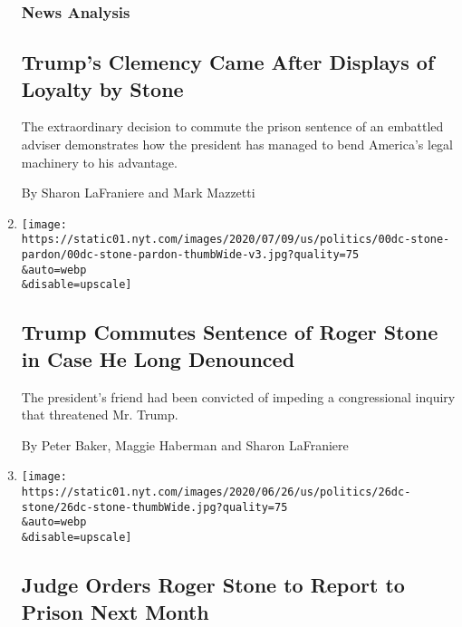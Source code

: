 \begin{enumerate}
  \hypertarget{news-analysis}{%
  \subsubsection{News Analysis}\label{news-analysis}}

  \hypertarget{trumps-clemency-came-after-displays-of-loyalty-by-stone}{%
  \subsection{Trump's Clemency Came After Displays of Loyalty by
  Stone}\label{trumps-clemency-came-after-displays-of-loyalty-by-stone}}

  The extraordinary decision to commute the prison sentence of an
  embattled adviser demonstrates how the president has managed to bend
  America's legal machinery to his advantage.

  By Sharon LaFraniere and Mark Mazzetti
\item
  \href{/2020/07/10/us/politics/trump-roger-stone-clemency.html}{}

  \texttt{[image: https://static01.nyt.com/images/2020/07/09/us/politics/00dc-stone-pardon/00dc-stone-pardon-thumbWide-v3.jpg?quality=75\\\&auto=webp\\\&disable=upscale]}

  \hypertarget{trump-commutes-sentence-of-roger-stone-in-case-he-long-denounced}{%
  \subsection{Trump Commutes Sentence of Roger Stone in Case He Long
  Denounced}\label{trump-commutes-sentence-of-roger-stone-in-case-he-long-denounced}}

  The president's friend had been convicted of impeding a congressional
  inquiry that threatened Mr. Trump.

  By Peter Baker, Maggie Haberman and Sharon LaFraniere
\item
  \href{/2020/06/26/us/politics/roger-stone-prison.html}{}

  \texttt{[image: https://static01.nyt.com/images/2020/06/26/us/politics/26dc-stone/26dc-stone-thumbWide.jpg?quality=75\\\&auto=webp\\\&disable=upscale]}

  \hypertarget{judge-orders-roger-stone-to-report-to-prison-next-month}{%
  \subsection{Judge Orders Roger Stone to Report to Prison Next
  Month}\label{judge-orders-roger-stone-to-report-to-prison-next-month}}


\end{enumerate}
